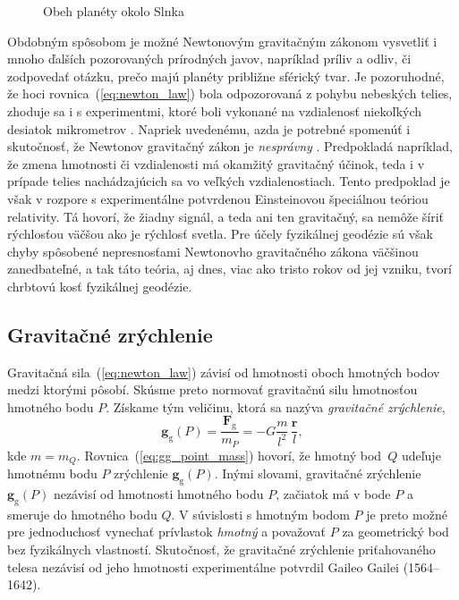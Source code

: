 \documentclass[a4paper, 12pt]{book}
\newcommand{\gidx}{\mathrm g}
\let\vec\mathbf
\begin{document}
\begin{figure}
\centering

\caption{Obeh planéty okolo Slnka}
\label{fig:orbital_motion}
\end{figure}

Obdobným spôsobom je možné Newtonovým gravitačným zákonom vysvetliť i mnoho 
ďalších pozorovaných prírodných javov, napríklad príliv a odliv, či zodpovedať 
otázku, prečo majú planéty približne sférický tvar.  Je pozoruhodné, že hoci 
rovnica~(\ref{eq:newton_law}) bola odpozorovaná z pohybu nebeských telies, 
zhoduje sa i s experimentmi, ktoré boli vykonané na vzdialenosť niekoľkých 
desiatok mikrometrov \citep{Lee2020}.  Napriek uvedenému, azda je potrebné 
spomenúť i skutočnosť, že Newtonov gravitačný zákon je \emph{nesprávny} 
\citep{Feynman}.  Predpokladá napríklad, že zmena hmotnosti či vzdialenosti má 
okamžitý gravitačný účinok, teda i v prípade telies nachádzajúcich sa vo 
veľkých vzdialenostiach.  Tento predpoklad je však v rozpore s experimentálne 
potvrdenou Einsteinovou špeciálnou teóriou relativity.  Tá hovorí, že žiadny 
signál, a teda ani ten gravitačný, sa nemôže šíriť rýchlosťou väčšou ako je 
rýchlosť svetla.  Pre účely fyzikálnej geodézie sú však chyby spôsobené 
nepresnosťami Newtonovho gravitačného zákona väčšinou zanedbateľné, a tak táto 
teória, aj dnes, viac ako tristo rokov od jej vzniku, tvorí chrbtovú kosť 
fyzikálnej geodézie.






\subsection{Gravitačné zrýchlenie}
\label{sec:gg}

Gravitačná sila~(\ref{eq:newton_law}) závisí od hmotnosti oboch hmotných 
bodov medzi ktorými pôsobí.  Skúsme preto normovať gravitačnú silu hmotnosťou 
hmotného bodu $P$.  Získame tým veličinu, ktorá sa nazýva \emph{gravitačné 
zrýchlenie},
%
\begin{equation}
\label{eq:gg_point_mass}
\vec g_\gidx(P) = \frac{\vec F_\gidx}{m_P} = -G \frac{m}{l^2} \, \frac{\vec 
r}{l}{,}
\end{equation}
%
kde $m = m_Q$.  Rovnica~(\ref{eq:gg_point_mass}) hovorí, že hmotný 
bod~$Q$ udeľuje hmotnému bodu $P$ zrýchlenie $\vec g_\gidx(P)$.   Inými 
slovami, gravitačné zrýchlenie $\vec g_\gidx(P)$ nezávisí od hmotnosti hmotného 
bodu $P$, začiatok má v bode $P$ a smeruje do hmotného bodu $Q$.  V súvislosti 
s hmotným bodom $P$ je preto možné pre jednoduchosť vynechať prívlastok 
\emph{hmotný} a považovať $P$ za geometrický bod bez fyzikálnych vlastností.  
Skutočnosť, že gravitačné zrýchlenie priťahovaného telesa nezávisí od jeho 
hmotnosti experimentálne potvrdil Gaileo Gailei (1564--1642).
\end{document}
